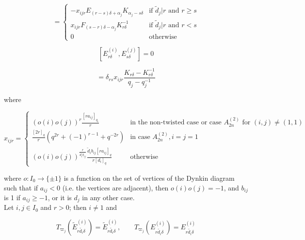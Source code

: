 \documentclass[12pt]{amsart}
\numberwithin{equation}{section}
\begin{document}
\begin{equation}
    [E_{r\delta}^{(i)}, F_{s\delta - \alpha_j}] = \begin{cases}
        -x_{ijr}E_{(r - s)\delta+\alpha_j}K_{\alpha_j-s\delta} & \mbox{if } \tilde{d}_j|r \mbox{ and } r\geq s \\
        x_{ijr}F_{(s-r)\delta - \alpha_j}K^{-1}_{r\delta} & \mbox{if } \tilde{d}_j|r \mbox{ and } r < s\\
        0 & \mbox{otherwise}
    \end{cases}
\end{equation}

\begin{equation}\label{for2.5}
    [E_{r\delta}^{(i)}, E_{s\delta}^{(j)}] = 0
\end{equation}

\begin{equation}
    [E_{r\delta}^{(i)}, F_{s\delta}^{(j)}] = \delta_{rs}x_{ijr}\frac{K_{r\delta} - K^{-1}_{r\delta}}{q_j - q_j^{-1}}
\end{equation}

where

\begin{equation*}
    x_{ijr} = \begin{cases}
        (o(i)o(j))^r{\displaystyle\frac{[ra_{ij}]_{q_i}}{r}} & \mbox{in the non-twisted case or case } A_{2n}^{(2)} \mbox{ for } (i,j) \neq (1,1)\\
        {\displaystyle\frac{[2r]_q}{r}}(q^{2r}+(-1)^{r-1}+q^{-2r}) & \mbox{in case } A_{2n}^{(2)}, i=j=1\\
        (o(i)o(j))^{\frac{r}{\tilde{d}_ib_{ij}}}{\displaystyle\frac{\tilde{d}_ib_{ij}[ra_{ij}]_{q}}{r[d_i]_q}} & \mbox{otherwise}
    \end{cases}
\end{equation*}

where $o : I_0 \to \{\pm 1\}$ is a function on the set of vertices of the Dynkin diagram such that if $a_{ij} < 0$ (i.e. the vertices are adjacent), then $o(i)o(j)=-1$, and $b_{ij}$ is 1 if $a_{ij}\geq -1$, or it is $d_j$ in any other case.  \\

Let $i,j\in I_0$ and $r>0$; then $i \neq 1$ and

\begin{equation}
    T_{\varpi_j}(\tilde{E}_{r\tilde{d_i}\delta}^{(i)}) = \tilde{E}_{r\tilde{d_i}\delta}^{(i)}, \quad \quad T_{\varpi_j}(E_{r\tilde{d_i}\delta}^{(i)}) = E_{r\tilde{d_i}\delta}^{(i)}
\end{equation}
\end{document}
